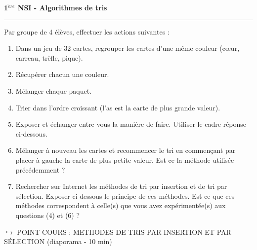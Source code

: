 \documentclass[a4paper,french]{article}
\newcounter{exonum}
\newcommand{\Exo}{\addtocounter{exonum}{1}{{\large \textbf {Exercice \theexonum .}}}}
\newcommand{\Titre}[1]{\textbf{{\large{#1}}}}
\begin{document}
\pagestyle{empty}
\parindent 0mm

\begin{center}
\Titre{1$^{\grave{e}re}$ NSI  -  Algorithmes de tris}
\\[5mm]
\end{center}
\hrule
\vspace*{5mm}

\Exo

Par groupe de 4 élèves, effectuer les actions suivantes :
\begin{enumerate}
\item Dans un jeu de 32 cartes, regrouper les cartes d'une même couleur (cœur, carreau, trèfle, pique).
\item Récupérer chacun une couleur.

\item Mélanger chaque paquet.

\item Trier dans l'ordre croissant (l'as est la carte de plus grande valeur).

\item Exposer et échanger entre vous la manière de faire. Utiliser le cadre réponse ci-dessous.

\noindent{}

\item Mélanger à nouveau les cartes et recommencer le tri en commençant par placer à gauche la carte de plus petite valeur. Est-ce la méthode utilisée précédemment ?

\noindent{}

\item Rechercher sur Internet les méthodes de tri par insertion et de tri par sélection. Exposer ci-dessous le principe de ces méthodes. Est-ce que ces méthodes correspondent à celle(s) que vous avez expérimentée(s) aux questions (4) et (6) ?

\noindent{}
\end{enumerate}
\bigskip

$\hookrightarrow$ POINT COURS : METHODES DE TRIS PAR INSERTION ET PAR SÉLECTION (diaporama - 10 min)
\pagebreak

\Exo
\end{document}
